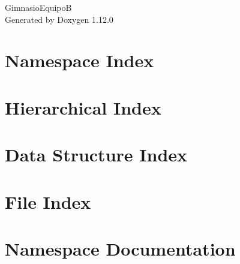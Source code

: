 \documentclass[twoside]{book}
\newcommand{\+}{\discretionary{\mbox{\scriptsize$\hookleftarrow$}}{}{}}
\newcommand{\clearemptydoublepage}{%
    \newpage{\pagestyle{empty}\cleardoublepage}%
  }
\begin{document}
  \raggedbottom
    \hypersetup{pageanchor=false,
                bookmarksnumbered=true,
                pdfencoding=unicode
               }
  \begin{titlepage}
  \vspace*{7cm}
  \begin{center}%
  {\Large Gimnasio\+EquipoB}\\
  \vspace*{1cm}
  {\large Generated by Doxygen 1.12.0}\\
  \end{center}
  \end{titlepage}
  \clearemptydoublepage
  \tableofcontents
  \clearemptydoublepage
  \hypersetup{pageanchor=true}




\chapter{Namespace Index}

\chapter{Hierarchical Index}

\chapter{Data Structure Index}

\chapter{File Index}

\chapter{Namespace Documentation}









\end{document}
